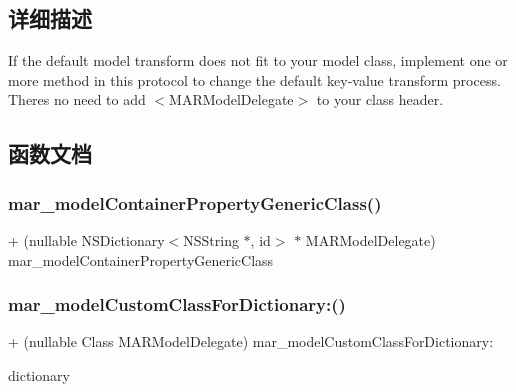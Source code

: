 \subsection{详细描述}
If the default model transform does not fit to your model class, implement one or more method in this protocol to change the default key-\/value transform process. There\textquotesingle{}s no need to add \textquotesingle{}$<$\+M\+A\+R\+Model\+Delegate$>$\textquotesingle{} to your class header. 

\subsection{函数文档}
\mbox{\label{protocol_m_a_r_model_delegate_01-p_af7cf142a16860d5f4f8d9c7a17f11c23}} 
\subsubsection{\texorpdfstring{mar\+\_\+model\+Container\+Property\+Generic\+Class()}{mar\_modelContainerPropertyGenericClass()}}
{\footnotesize\ttfamily + (nullable N\+S\+Dictionary$<$N\+S\+String $\ast$, id$>$ $\ast$ M\+A\+R\+Model\+Delegate) mar\+\_\+model\+Container\+Property\+Generic\+Class \begin{DoxyParamCaption}{ }\end{DoxyParamCaption}}

\mbox{\label{protocol_m_a_r_model_delegate_01-p_a18b11abd9ed33fc031571e26829a0838}} 
\subsubsection{\texorpdfstring{mar\+\_\+model\+Custom\+Class\+For\+Dictionary\+:()}{mar\_modelCustomClassForDictionary:()}}
{\footnotesize\ttfamily + (nullable Class M\+A\+R\+Model\+Delegate) mar\+\_\+model\+Custom\+Class\+For\+Dictionary\+: \begin{DoxyParamCaption}\item[{(N\+S\+Dictionary $\ast$)}]{dictionary }\end{DoxyParamCaption}}

